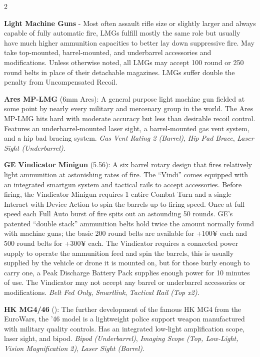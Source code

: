 \documentclass[
  oneside]{article}
\begin{document}
\begin{multicols}{2}

\textbf{Light Machine Guns} - Most often assault
rifle size or slightly larger and always capable
of fully automatic fire, LMGs fulfill mostly the
same role but usually have much higher ammunition
capacities to better lay down suppressive fire.
May take top-mounted, barrel-mounted, and
underbarrel accessories and modifications. Unless
otherwise noted, all LMGs may accept 100 round or
250 round belts in place of their detachable
magazines. LMGs suffer double the penalty from
Uncompensated Recoil.

\textbf{Ares MP-LMG} (6mm Ares): A general purpose
light machine gun fielded at some point by nearly
every military and mercenary group in the world.
The Ares MP-LMG hits hard with moderate accuracy
but less than desirable recoil control. Features
an underbarrel-mounted laser sight, a
barrel-mounted gas vent system, and a hip bad
bracing system. \emph{Gas Vent Rating 2 (Barrel)},
\emph{Hip Pad Brace}, \emph{Laser Sight
(Underbarrel)}.

\textbf{GE Vindicator Minigun} (5.56): A six
barrel rotary design that fires relatively light
ammunition at astonishing rates of fire. The
``Vindi'' comes equipped with an integrated
smartgun system and tactical rails to accept
accessories. Before firing, the Vindicator Minigun
requires 1 entire Combat Turn and a single
Interact with Device Action to spin the barrels up
to firing speed. Once at full speed each Full Auto
burst of fire spits out an astounding 50 rounds.
GE's patented ``double stack'' ammunition belts
hold twice the amount normally found with machine
guns; the basic 200 round belts are available for
+100¥ each and 500 round belts for +300¥ each. The
Vindicator requires a connected power supply to
operate the ammunition feed and spin the barrels,
this is usually supplied by the vehicle or drone
it is mounted on, but for those burly enough to
carry one, a Peak Discharge Battery Pack supplies
enough power for 10 minutes of use. The Vindicator
may not accept any barrel or underbarrel
accessories or modifications. \emph{Belt Fed
Only}, \emph{Smartlink}, \emph{Tactical Rail (Top
x2)}.

\textbf{HK MG4/46} (): The further development of
the famous HK MG4 from the EuroWars, the '46 model
is a lightweight police support weapon
manufactured with military quality controls. Has
an integrated low-light amplification scope, laser
sight, and bipod. \emph{Bipod (Underbarrel)},
\emph{Imaging Scope (Top, Low-Light, Vision
Magnification 2)}, \emph{Laser Sight (Barrel)}.


\end{multicols}
\end{document}
